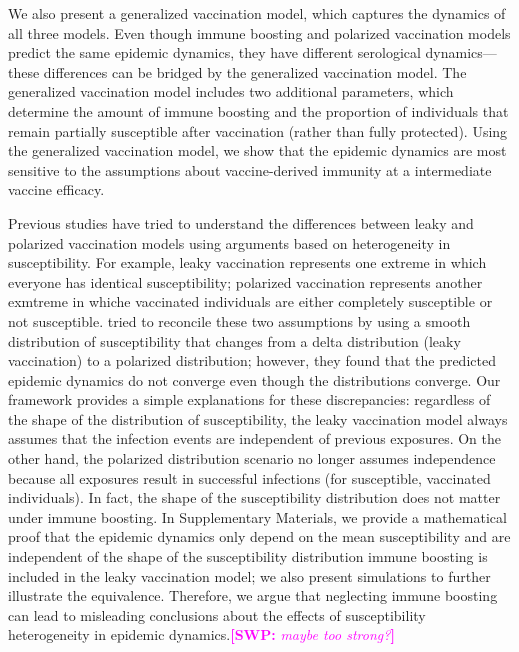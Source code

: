 \documentclass[12pt]{article}
\newcommand{\comment}{\showcomment}
\newcommand{\showcomment}[3]{\textcolor{#1}{\textbf{[#2: }\textsl{#3}\textbf{]}}}
\newcommand{\swp}[1]{\comment{magenta}{SWP}{#1}}
\begin{document}
We also present a generalized vaccination model, which captures the dynamics of all three models.
Even though immune boosting and polarized vaccination models predict the same epidemic dynamics, they have different serological dynamics---these differences can be bridged by the generalized vaccination model.
The generalized vaccination model includes two additional parameters, which determine the amount of immune boosting and the proportion of individuals that remain partially susceptible after vaccination (rather than fully protected).
Using the generalized vaccination model, we show that the epidemic dynamics are most sensitive to the assumptions about vaccine-derived immunity at a intermediate vaccine efficacy.

Previous studies have tried to understand the differences between leaky and polarized vaccination models using arguments based on heterogeneity in susceptibility.
For example, leaky vaccination represents one extreme in which everyone has identical susceptibility;
polarized vaccination represents another exmtreme in whiche vaccinated individuals are either completely susceptible or not susceptible.
\cite{gomes2014missing} tried to reconcile these two assumptions by using a smooth distribution of susceptibility that changes from a delta distribution (leaky vaccination) to a polarized distribution;
however, they found that the predicted epidemic dynamics do not converge even though the distributions converge.
Our framework provides a simple explanations for these discrepancies:
regardless of the shape of the distribution of susceptibility, the leaky vaccination model always assumes that the infection events are independent of previous exposures.
On the other hand, the polarized distribution scenario no longer assumes independence because all exposures result in successful infections (for susceptible, vaccinated individuals).
In fact, the shape of the susceptibility distribution does not matter under immune boosting.
In Supplementary Materials, we provide a mathematical proof that the epidemic dynamics only depend on the mean susceptibility and are independent of the shape of the  susceptibility distribution immune boosting is included in the leaky vaccination model; we also present simulations to further illustrate the equivalence.
Therefore, we argue that neglecting immune boosting can lead to misleading conclusions about the effects of susceptibility heterogeneity in epidemic dynamics.\swp{maybe too strong?}
\end{document}
